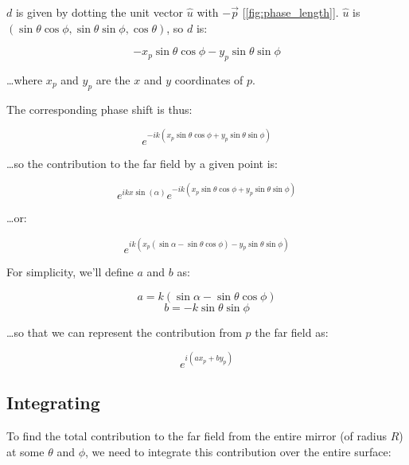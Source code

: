 \documentclass[etd,twoside,senior]{BYUPhys}
\begin{document}
$d$ is given by dotting the unit vector $\hat{u}$ with $-\vec{p}$ [\ref{fig:phase_length}]. $\hat{u}$ is $\left(\sin{\theta}\cos{\phi},\sin{\theta}\sin{\phi},\cos{\theta}\right)$, so $d$ is:

\begin{equation}
  -x_p\sin{\theta}\cos{\phi}-y_p\sin{\theta}\sin{\phi}
\end{equation}

\ldots where $x_p$ and $y_p$ are the $x$ and $y$ coordinates of $p$.

The corresponding phase shift is thus:

\begin{equation}
  e^{-ik(x_p\sin{\theta}\cos{\phi}+y_p\sin{\theta}\sin{\phi})}
\end{equation}

\ldots so the contribution to the far field by a given point is:

\begin{equation}
  e^{ikx\sin\left({\alpha}\right)}e^{-ik(x_p\sin{\theta}\cos{\phi}+y_p\sin{\theta}\sin{\phi})}
\end{equation}

\ldots or:

\begin{equation}
  e^{ik\left(x_p(\sin{\alpha}-\sin{\theta}\cos{\phi})-y_p\sin{\theta}\sin{\phi}\right)}
\end{equation}

For simplicity, we'll define $a$ and $b$ as:

\begin{equation}
  a = k\left(\sin{\alpha}-\sin{\theta}\cos{\phi}\right)
\end{equation}
\begin{equation}
  b = -k\sin{\theta}\sin{\phi}
\end{equation}

\ldots so that we can represent the contribution from $p$ the far field as:

\begin{equation}
  e^{i(ax_p+by_p)}
\end{equation}

\subsection{Integrating} \label{sec:integrating}

To find the total contribution to the far field from the entire mirror (of radius $R$) at some $\theta$ and $\phi$, we need to integrate this contribution over the entire surface:
\end{document}
